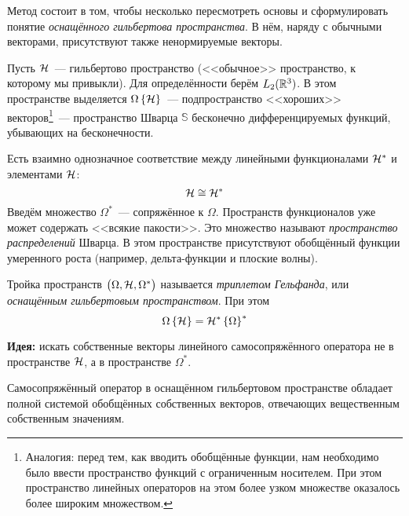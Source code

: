 
Метод состоит в том, чтобы несколько пересмотреть основы и сформулировать понятие \emph{оснащённого гильбертова пространства}. В нём, наряду с обычными векторами, присутствуют также ненормируемые векторы.

Пусть $\mathcal H$~--- гильбертово пространство (<<обычное>> пространство, к которому мы привыкли). Для определённости берём $L_2(\mathbb {R}^3)$. В этом пространстве выделяется $\Omega \left\{ \mathcal H \right\}$~--- подпространство <<хороших>> векторов\footnote{Аналогия: перед тем, как вводить обобщённые функции, нам необходимо было ввести пространство функций с ограниченным носителем. При этом пространство линейных операторов на этом более узком множестве оказалось более широким множеством.}~--- пространство Шварца $\mathbb{S}$ бесконечно дифференцируемых функций, убывающих на бесконечности.

\Reminder Есть взаимно однозначное соответствие между линейными функционалами $\mathcal H^\ast$ и элементами $\mathcal H$:
$$
    \mathcal H \cong \mathcal H^\ast
$$
Введём множество $\Omega^\ast$~--- сопряжённое к $\Omega$. Пространств функционалов уже может содержать <<всякие пакости>>. Это множество называют \emph{пространство распределений} Шварца. В этом пространстве присутствуют обобщённый функции умеренного роста (например, дельта-функции и плоские волны).

\Def Тройка пространств $\big(\Omega, \mathcal H, \Omega^\ast\big)$ называется \emph{триплетом Гельфанда}, или \emph{оснащённым гильбертовым пространством}. При этом
$$
    \Omega \left\{ \mathcal H \right\} = \mathcal H^\ast \left\{ \Omega \right\}^\ast
$$

\textbf{Идея:} искать собственные векторы линейного самосопряжённого оператора не в пространстве $\mathcal H$, а в пространстве $\Omega^\ast$.

\Th Самосопряжённый оператор в оснащённом гильбертовом пространстве обладает полной системой обобщённых собственных векторов, отвечающих вещественным собственным значениям.

